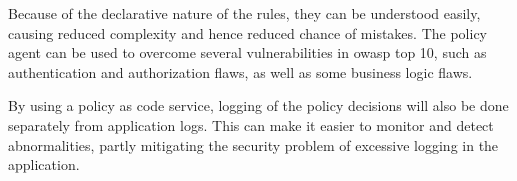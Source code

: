 Because of the declarative nature of the rules, they can be understood easily, causing reduced complexity and hence reduced chance of mistakes.
The policy agent can be used to overcome several vulnerabilities in \gls{owasp} top 10, such as authentication and authorization flaws, as well as some business logic flaws.

By using a policy as code service, logging of the policy decisions will also be done separately from application logs.
This can make it easier to monitor and detect abnormalities, partly mitigating the security problem of excessive logging in the application.